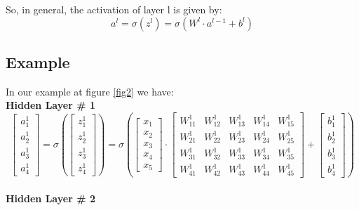 \documentclass[12pt]{article}
\begin{document}
So, in general, the activation of layer l is given by:
\begin{equation}
    a^{l} = \sigma (z^{l}) = \sigma ( W^{l} \cdot a^{l-1} + b^{l} )
\end{equation}

\subsection{Example}

In our example at figure \ref{fig2} we have:
\\
\textbf{Hidden Layer \# 1}
\begin{equation}
\begin{bmatrix}
a_{1}^{1}\\
a_{2}^{1}\\
a_{3}^{1}\\
a_{4}^{1}
\end{bmatrix}
=
\sigma
\left(
\begin{bmatrix}
z_{1}^{1}\\
z_{2}^{1}\\
z_{3}^{1}\\
z_{4}^{1}
\end{bmatrix}
\right)
=
\sigma
\left(
\begin{bmatrix}
x_{1}\\
x_{2}\\
x_{3}\\
x_{4}\\
x_{5}
\end{bmatrix}
\cdot
\begin{bmatrix}
W_{11}^{1} & W_{12}^{1} & W_{13}^{1} & W_{14}^{1} & W_{15}^{1} \\
W_{21}^{1} & W_{22}^{1} & W_{23}^{1} & W_{24}^{1} & W_{25}^{1} \\
W_{31}^{1} & W_{32}^{1} & W_{33}^{1} & W_{34}^{1} & W_{35}^{1} \\
W_{41}^{1} & W_{42}^{1} & W_{43}^{1} & W_{44}^{1} & W_{45}^{1} 
\end{bmatrix}
 +
 \begin{bmatrix}
b_{1}^{1}\\
b_{2}^{1}\\
b_{3}^{1}\\
b_{4}^{1}
\end{bmatrix}
\right)
\end{equation}
\\
\textbf{Hidden Layer \# 2}
\end{document}
